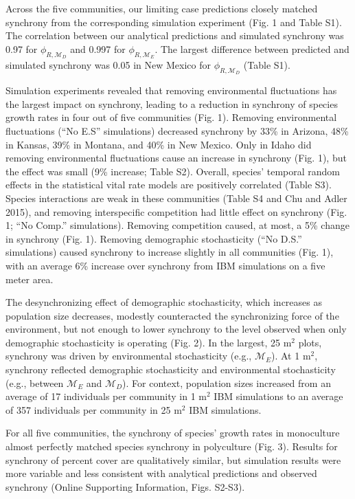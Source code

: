\documentclass[12pt,]{article}
\begin{document}
Across the five communities, our limiting case predictions closely
matched synchrony from the corresponding simulation experiment (Fig. 1
and Table S1). The correlation between our analytical predictions and
simulated synchrony was 0.97 for \(\phi_{R,\mathcal{M}_D}\) and 0.997
for \(\phi_{R,\mathcal{M}_E}\). The largest difference between predicted
and simulated synchrony was 0.05 in New Mexico for
\(\phi_{R,\mathcal{M}_D}\) (Table S1).

Simulation experiments revealed that removing environmental fluctuations
has the largest impact on synchrony, leading to a reduction in synchrony
of species growth rates in four out of five communities (Fig. 1).
Removing environmental fluctuations (``No E.S'' simulations) decreased
synchrony by 33\% in Arizona, 48\% in Kansas, 39\% in Montana, and 40\%
in New Mexico. Only in Idaho did removing environmental fluctuations
cause an increase in synchrony (Fig. 1), but the effect was small (9\%
increase; Table S2). Overall, species' temporal random effects in the
statistical vital rate models are positively correlated (Table S3).
Species interactions are weak in these communities (Table S4 and Chu and
Adler 2015), and removing interspecific competition had little effect on
synchrony (Fig. 1; ``No Comp.'' simulations). Removing competition
caused, at most, a 5\% change in synchrony (Fig. 1). Removing
demographic stochasticity (``No D.S.'' simulations) caused synchrony to
increase slightly in all communities (Fig. 1), with an average 6\%
increase over synchrony from IBM simulations on a five meter area.

The desynchronizing effect of demographic stochasticity, which increases
as population size decreases, modestly counteracted the synchronizing
force of the environment, but not enough to lower synchrony to the level
observed when only demographic stochasticity is operating (Fig. 2). In
the largest, 25 \(\text{m}^2\) plots, synchrony was driven by
environmental stochasticity (e.g., \(\mathcal{M}_E\)). At 1
\(\text{m}^2\), synchrony reflected demographic stochasticity and
environmental stochasticity (e.g., between \(\mathcal{M}_E\) and
\(\mathcal{M}_D\)). For context, population sizes increased from an
average of 17 individuals per community in 1 \(\text{m}^2\) IBM
simulations to an average of 357 individuals per community in 25
\(\text{m}^2\) IBM simulations.

For all five communities, the synchrony of species' growth rates in
monoculture almost perfectly matched species synchrony in polyculture
(Fig. 3). Results for synchrony of percent cover are qualitatively
similar, but simulation results were more variable and less consistent
with analytical predictions and observed synchrony (Online Supporting
Information, Figs. S2-S3).
\end{document}
